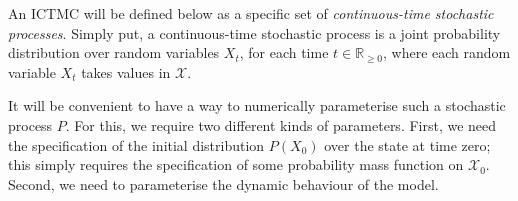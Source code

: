 \documentclass[twoside,11pt]{article}
\newcommand{\reals}{\mathbb{R}}
\newcommand{\realsnonneg}{\reals_{\geq 0}}
\newcommand{\states}{\mathcal{X}}
\begin{document}
An ICTMC will be defined below as a specific set of \emph{continuous-time stochastic processes}. Simply put, a continuous-time stochastic process is a joint probability distribution over random variables $X_t$, for each time $t\in\realsnonneg$, where each random variable $X_t$ takes values in $\states$. 



It will be convenient to have a way to numerically parameterise such a stochastic process $P$. For this, we require two different kinds of parameters. First, we need the specification of the initial distribution $P(X_0)$ over the state at time zero; this simply requires the specification of some probability mass function on $\states_0$. Second, we need to parameterise the dynamic behaviour of the model.
\end{document}
